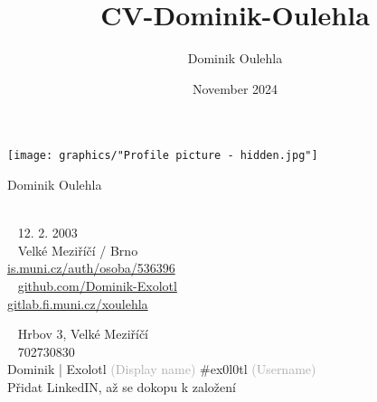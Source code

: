 \documentclass{modernsimplecv}
\title{CV-Dominik-Oulehla}
\author{Dominik Oulehla}
\date{November 2024}
\begin{document}
\thispagestyle{empty}




\begin{minipage}[t]{0.21\textwidth}

    \vspace{0pt} %

    \texttt{[image: graphics/"Profile picture - hidden.jpg"]}\hspace{1em}

\end{minipage}
\hfill
\begin{minipage}[t]{0.77\textwidth}
    \vspace{0pt} %
    \begin{shaded*}
        \begin{minipage}[t]{0.4\textwidth}
            \vspace{0pt} %
            {\par\centering\huge\textsf{Dominik Oulehla}} \\[0.3cm]
            \faBirthdayCake~ 12. 2. 2003 \\
            \faMapMarker~ Velké Meziříčí / Brno \\
            {\small
             \protect\url{is.muni.cz/auth/osoba/536396} \\
            \faGithub~ \protect\url{github.com/Dominik-Exolotl} \\
             \protect\url{gitlab.fi.muni.cz/xoulehla}
            }
        \end{minipage}\hfill
        \begin{minipage}[t]{0.55\textwidth}
            \vspace{0pt}
            \faEnvelopeO~ Hrbov 3, Velké Meziříčí \\
            \faPhone~ 702730830 \\
             Dominik | Exolotl \scriptsize \textcolor{darkgrey}{(Display name)}\normalsize{ \#ex0l0tl} \scriptsize \textcolor{darkgrey}{(Username)} \normalsize\\
             \small{Přidat LinkedIN, až se dokopu k založení} \normalsize \\[0.175cm]

\end{minipage}
\end{shaded*}
\end{minipage}
\end{document}
